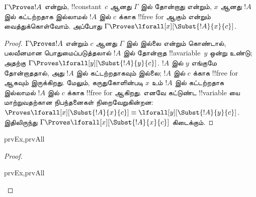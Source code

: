 \documentclass[../../../include/open-logic-section]{subfiles}
\begin{document}
\begin{thm}[மாறிலிக் குறிகளின் வலிமையான பொதுமைப்படுத்தல்]
$\Gamma \Proves !A$ என்றும், !!{constant}~$c$ ஆனது $\Gamma$ இல்
தோன்றாது என்றும், $x$ ஆனது $!A$ இல் கட்டற்றதாக இல்லாமல் $!A$ இல் $c$
க்காக !!{free for} ஆகும் என்றும் வைத்துக்கொள்வோம். அப்போது
$\Gamma \Proves \lforall[x][\Subst{!A}{x}{c}]$.
\end{thm}

\begin{proof}
$\Gamma \Proves !A$ என்றும் $c$ ஆனது $\Gamma$ இல் இல்லை என்றும்
கொண்டால், பலவீனமான பொதுமைப்படுத்தலால் $!A$ இல் தோன்றாத
!!a{variable}~$y$ ஒன்று உண்டு; அதற்கு $\Gamma \Proves
\lforall[y][\Subst{!A}{y}{c}]$. $!A$ இல் $y$ எங்குமே தோன்றாததால்,
அது $!A$ இல் கட்டற்றதாகவும் இல்லை; $!A$ இல் $c$ க்காக
!!{free for} ஆகவும் இருக்கிறது. மேலும், கருதுகோளின்படி $x$ உம்
$!A$ இல் கட்டற்றதாக இல்லாமல் $!A$ இல் $c$ க்காக !!{free for} ஆகிறது.
எனவே கட்டுண்ட !!{variable} யை மாற்றுவதற்கான நிபந்தனைகள் நிறைவேறுகின்றன:
$\Proves \lforall[x][\Subst{!A}{x}{c}] \equiv
\lforall[y][\Subst{!A}{y}{c}]$. இதிலிருந்து $\Gamma \Proves
\lforall[x][\Subst{!A}{x}{c}]$ கிடைக்கும்.
\end{proof}

\begin{thm}
\begin{tagenumerate}{prvEx,prvAll}
\end{tagenumerate}
\end{thm}

\begin{proof}
\begin{tagenumerate}{prvEx,prvAll}

\end{tagenumerate}
\end{proof}
\end{document}
